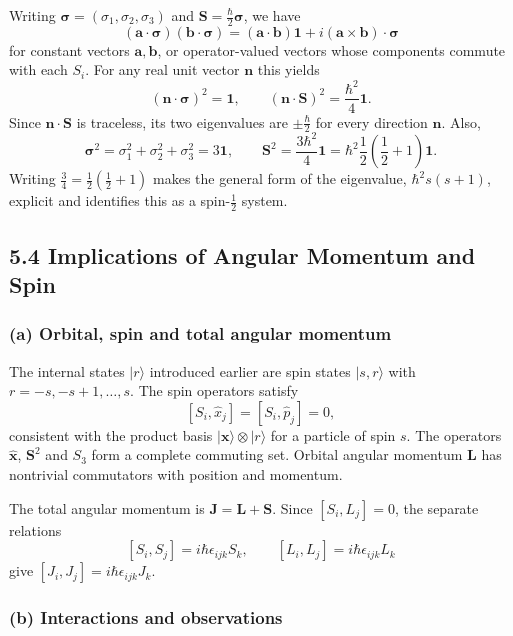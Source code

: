\documentclass[11pt,a4paper]{article}
\begin{document}
Writing $\boldsymbol{\sigma}=(\sigma_1,\sigma_2,\sigma_3)$ and
$\mathbf S=\frac{\hbar}{2}\boldsymbol{\sigma}$, we have
\[
    (\mathbf a\cdot\boldsymbol{\sigma})
    (\mathbf b\cdot\boldsymbol{\sigma})
    =(\mathbf a\cdot\mathbf b)\mathbf 1
      +i(\mathbf a\times\mathbf b)\cdot\boldsymbol{\sigma}
\]
for constant vectors $\mathbf a,\mathbf b$, or operator-valued
vectors whose components commute with each $S_i$.
For any real unit vector $\mathbf n$ this yields
\[
    (\mathbf n\cdot\boldsymbol{\sigma})^2=\mathbf 1,\qquad
    (\mathbf n\cdot\mathbf S)^2=\frac{\hbar^2}{4}\mathbf 1.
\]
Since $\mathbf n\cdot\mathbf S$ is traceless, its two eigenvalues are
$\pm\frac{\hbar}{2}$ for every direction $\mathbf n$. Also,
\[
    \boldsymbol{\sigma}^2=\sigma_1^2+\sigma_2^2+\sigma_3^2
    =3\mathbf 1,\qquad
    \mathbf S^2=\frac{3\hbar^2}{4}\mathbf 1
    =\hbar^2\frac12\left(\frac12+1\right)\mathbf 1.
\]
Writing $\frac34=\frac12(\frac12+1)$ makes the general form of the
eigenvalue, $\hbar^2s(s+1)$, explicit and identifies this as a spin-$\frac12$
system.

\subsection*{5.4 Implications of Angular Momentum and Spin}

\subsubsection*{(a) Orbital, spin and total angular momentum}

The internal states $|r\rangle$ introduced earlier are spin states
$|s,r\rangle$ with $r=-s,-s+1,\ldots,s$. The spin operators satisfy
\[
    [S_i,\hat x_j]=[S_i,\hat p_j]=0,
\]
consistent with the product basis
$|\mathbf x\rangle\otimes|r\rangle$ for a particle of spin $s$.
The operators $\hat{\mathbf x}$, $\mathbf S^2$ and $S_3$ form a
complete commuting set. Orbital angular momentum $\mathbf L$ has
nontrivial commutators with position and momentum.

The total angular momentum is $\mathbf J=\mathbf L+\mathbf S$.
Since $[S_i,L_j]=0$, the separate relations
\[
    [S_i,S_j]=i\hbar\epsilon_{ijk}S_k,\qquad
    [L_i,L_j]=i\hbar\epsilon_{ijk}L_k
\]
give $[J_i,J_j]=i\hbar\epsilon_{ijk}J_k$.

\subsubsection*{(b) Interactions and observations}
\end{document}
